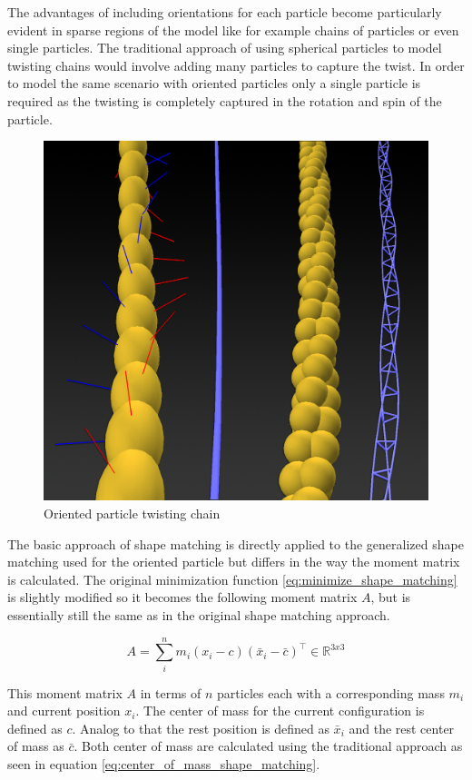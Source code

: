 The advantages of including orientations for each particle become particularly evident in sparse regions of the model like for example chains of particles or even single particles. The traditional approach of using spherical particles to model twisting chains would involve adding many particles to capture the twist. In order to model the same scenario with oriented particles only a single particle is required as the twisting is completely captured in the rotation and spin of the particle.

\begin{figure}[htb]
\centering
\includegraphics[width=.5\textwidth]{images/oriented_particle_twist_chain.png}
\caption[Oriented particle twisting chain]{Oriented particle twisting chain\cite{Muller:2011gn}}
\label{img:oriented_particle_twist_chain}
\end{figure}

The basic approach of shape matching is directly applied to the generalized shape matching used for the oriented particle but differs in the way the moment matrix is calculated. The original minimization function \ref{eq:minimize_shape_matching} is slightly modified so it becomes the following moment matrix $A$, but is essentially still the same as in the original shape matching approach.

\begin{equation}
A = \sum\limits_i^n m_i(x_i-c)(\bar{x}_i - \bar{c})^\top  \in \mathbb{R}^{3x3}
\label{eq:minimize_oriented_particle_1}
\end{equation}

This moment matrix $A$ in terms of $n$ particles each with a corresponding mass $m_i$ and current position $x_i$. The center of mass for the current configuration is defined as $c$. Analog to that the rest position is defined as $\bar{x}_i$ and the rest center of mass as $\bar{c}$. Both center of mass are calculated using the traditional approach as seen in equation \ref{eq:center_of_mass_shape_matching}.

